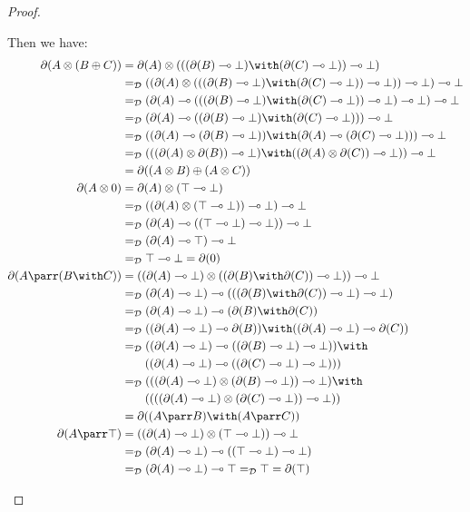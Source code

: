 \documentclass{lmcs}
\newcommand*{\tens}{\otimes} %
\newcommand*{\lolipop}{\multimap} %
\newcommand*{\eqeq}{=} %
\newcommand*{\thD}{\mathcal{D}}
\newcommand*{\isoc}{\eqeq_\thD} %
\newcommand*{\tradc}[1]{\partial(#1)}
\begin{document}
\begin{proof}
\begin{itemize}
Then we have:
{\allowdisplaybreaks
\begin{align*}
\tradc{A\tens(B\oplus C)}
  &= \tradc{A}\tens(((\tradc{B}\lolipop\bot)\with(\tradc{C}\lolipop\bot))\lolipop\bot)  \\
  &\isoc ((\tradc{A}\tens(((\tradc{B}\lolipop\bot)\with(\tradc{C}\lolipop\bot))\lolipop\bot))\lolipop\bot)\lolipop\bot  \\
  &\isoc (\tradc{A}\lolipop(((\tradc{B}\lolipop\bot)\with(\tradc{C}\lolipop\bot))\lolipop\bot)\lolipop\bot)\lolipop\bot  \\
  &\isoc (\tradc{A}\lolipop((\tradc{B}\lolipop\bot)\with(\tradc{C}\lolipop\bot)))\lolipop\bot  \\
  &\isoc ((\tradc{A}\lolipop(\tradc{B}\lolipop\bot))\with(\tradc{A}\lolipop(\tradc{C}\lolipop\bot)))\lolipop\bot  \\
  &\isoc (((\tradc{A}\tens\tradc{B})\lolipop\bot)\with((\tradc{A}\tens\tradc{C})\lolipop\bot))\lolipop\bot  \\
  &= \tradc{(A\tens B)\oplus (A\tens C)} \\
\tradc{A\tens 0}
  &= \tradc{A} \tens (\top \lolipop \bot)\\
  &\isoc ((\tradc{A} \tens (\top \lolipop \bot)) \lolipop \bot) \lolipop \bot\\
  &\isoc (\tradc{A} \lolipop ((\top \lolipop \bot) \lolipop \bot)) \lolipop \bot\\
  &\isoc (\tradc{A} \lolipop \top) \lolipop \bot\\
  &\isoc \top \lolipop \bot = \tradc{0} \\
\tradc{A\parr(B\with C)}
  &= ((\tradc{A}\lolipop \bot)\tens((\tradc{B}\with\tradc{C})\lolipop\bot))\lolipop\bot \\
  &\isoc (\tradc{A}\lolipop \bot)\lolipop(((\tradc{B}\with\tradc{C})\lolipop\bot)\lolipop\bot) \\
  &\isoc (\tradc{A}\lolipop \bot)\lolipop(\tradc{B}\with\tradc{C}) \\
  &\isoc ((\tradc{A}\lolipop \bot)\lolipop\tradc{B})\with((\tradc{A}\lolipop \bot)\lolipop\tradc{C}) \\
  &\isoc ((\tradc{A}\lolipop \bot)\lolipop((\tradc{B}\lolipop\bot)\lolipop\bot))\with\\
    &\tag{$(\tradc{A}\lolipop \bot)\lolipop((\tradc{C}\lolipop\bot)\lolipop\bot))$} \\
  &\isoc (((\tradc{A}\lolipop \bot)\tens(\tradc{B}\lolipop\bot))\lolipop\bot)\with\\
    &\tag{$(((\tradc{A}\lolipop \bot)\tens(\tradc{C}\lolipop\bot))\lolipop\bot)$} \\
  &= \tradc{(A\parr B) \with (A\parr C)} \\
\tradc{A\parr\top}
  &= ((\tradc{A}\lolipop \bot)\tens(\top\lolipop\bot))\lolipop\bot \\
  &\isoc (\tradc{A}\lolipop \bot)\lolipop((\top\lolipop\bot)\lolipop\bot) \\
  &\isoc (\tradc{A}\lolipop \bot)\lolipop\top \isoc \top = \tradc{\top} \qedhere
\end{align*}
}
\end{itemize}
\end{proof}
\end{document}
